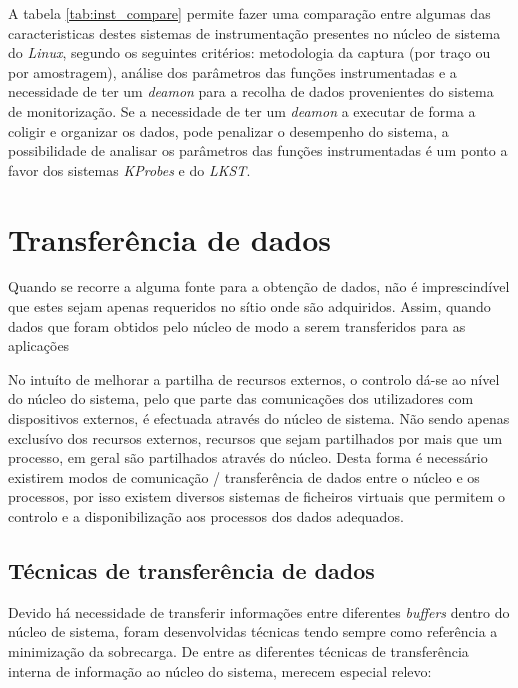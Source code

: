 
A tabela \ref{tab:inst_compare} permite fazer uma comparação entre algumas das caracteristicas destes sistemas de instrumentação presentes no núcleo de sistema do \textit{Linux}, segundo os seguintes critérios: metodologia da captura (por traço ou por amostragem), análise dos parâmetros das funções instrumentadas e a necessidade de ter um \textit{deamon} para a recolha de dados provenientes do sistema de monitorização.
Se a necessidade de ter um \textit{deamon} a executar de forma a coligir e organizar os dados, pode penalizar o desempenho do sistema, a possibilidade de analisar os parâmetros das funções instrumentadas é um ponto a favor dos sistemas \textit{KProbes} e do \textit{LKST}.



\section{Transferência de dados}
\label{sect:kernel_user_comm}


Quando se recorre a alguma fonte para a obtenção de dados, não é imprescindível que estes sejam apenas requeridos no sítio onde são adquiridos.
Assim, quando dados que foram obtidos pelo núcleo de modo a serem transferidos para as aplicações 

No intuíto de melhorar a partilha de recursos externos, o controlo dá-se ao nível do núcleo do sistema, pelo que parte das comunicações dos utilizadores com dispositivos externos, é efectuada através do núcleo de sistema.
Não sendo apenas exclusívo dos recursos externos, recursos que sejam partilhados por mais que um processo, em geral são partilhados através do núcleo.
Desta forma é necessário existirem modos de comunicação / transferência de dados entre o núcleo e os processos, por isso existem diversos sistemas de ficheiros virtuais que permitem o controlo e a disponibilização aos processos dos dados adequados.

\subsection{Técnicas de transferência de dados}

Devido há necessidade de transferir informações entre diferentes \textit{buffers} dentro do núcleo de sistema, foram desenvolvidas técnicas tendo sempre como referência a minimização da sobrecarga.
De entre as diferentes técnicas de transferência interna de informação ao núcleo do sistema, merecem especial relevo:

